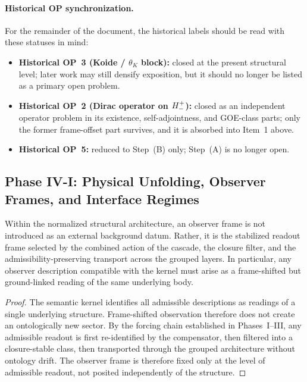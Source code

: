 \paragraph{Historical OP synchronization.}
For the remainder of the document, the historical labels should be read with
these statuses in mind:
\begin{itemize}[leftmargin=2em]
  \item \textbf{Historical OP~3 (Koide / $\theta_K$ block):} closed at the
        present structural level; later work may still densify exposition, but
        it should no longer be listed as a primary open problem.
  \item \textbf{Historical OP~2 (Dirac operator on $H^+_-$):} closed as
        an independent operator problem in its existence, self-adjointness,
        and GOE-class parts; only the former frame-offset part survives, and
        it is absorbed into Item~1 above.
  \item \textbf{Historical OP~5:} reduced to Step~(B) only; Step~(A) is no
        longer open.
\end{itemize}




\subsection*{Phase IV-I: Physical Unfolding, Observer Frames, and Interface Regimes}

\begin{lemma}
\label{lem:observer-frame-lemma}
Within the normalized structural architecture, an observer frame is not introduced as an external background datum. Rather, it is the stabilized readout frame selected by the combined action of the cascade, the closure filter, and the admissibility-preserving transport across the grouped layers. In particular, any observer description compatible with the kernel must arise as a frame-shifted but ground-linked reading of the same underlying body.
\end{lemma}

\begin{proof}
The semantic kernel identifies all admissible descriptions as readings of a single underlying structure. Frame-shifted observation therefore does not create an ontologically new sector. By the forcing chain established in Phases~I--III, any admissible readout is first re-identified by the compensator, then filtered into a closure-stable class, then transported through the grouped architecture without ontology drift. The observer frame is therefore fixed only at the level of admissible readout, not posited independently of the structure.
\end{proof}

